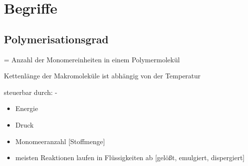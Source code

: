 
\section{Begriffe}
\subsection{Polymerisationsgrad}
= Anzahl der Monomereinheiten in einem Polymermolekül

Kettenlänge der Makromoleküle ist abhängig von der Temperatur

steuerbar durch: -
\begin{itemize}
    \item Energie
    \item Druck
    \item Monomeeranzahl [Stoffmenge]
    \item meisten Reaktionen laufen in Flüssigkeiten ab [gelößt, emulgiert, dispergiert]
\end{itemize}


